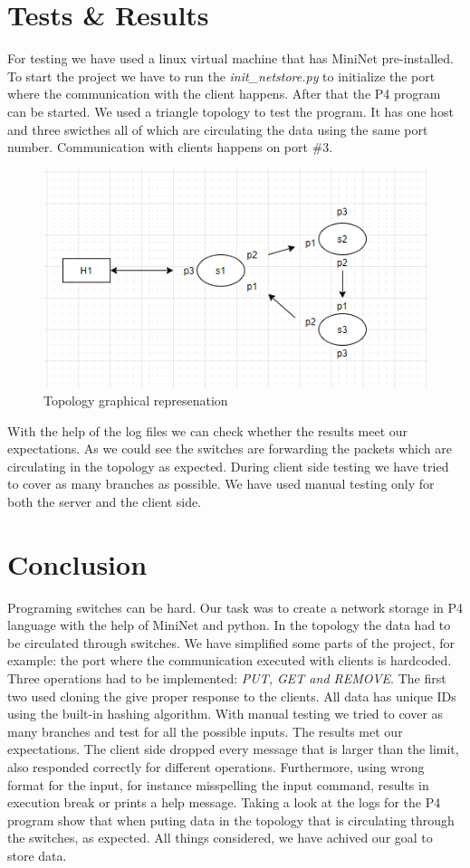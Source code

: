 \documentclass[sigconf,natbib=false]{acmart}
\begin{document}
\section{Tests \& Results}
For testing we have used a linux virtual machine that has MiniNet pre-installed. To start the project we have to run the \textit{init\_netstore.py} to initialize the port where the communication with the client happens. After that the P4 program can be started. We used a triangle topology to test the program. It has one host and three swicthes all of which are circulating the data using the same port number. Communication with clients happens on port \#3.
\begin{figure}[ht]
	\caption{Topology graphical represenation}
	\includegraphics[scale=0.7]{top.png}
	\centering
\end{figure}
With the help of the log files we can check whether the results meet our expectations. As we could see the switches are forwarding the packets which are circulating in the topology as expected. During client side testing we have tried to cover as many branches as possible. We have used manual testing only for both the server and the client side.
\section{Conclusion}
Programing switches can be hard. Our task was to create a network storage in P4 language with the help of MiniNet and python. In the topology the data had to be circulated through switches. We have simplified some parts of the project, for example: the port where the communication executed with clients is hardcoded. Three operations had to be implemented: \textit{PUT, GET and REMOVE}. The first two used cloning the give proper response to the clients. All data has unique IDs using the built-in hashing algorithm. With manual testing we tried to cover as many branches and test for all the possible inputs. The results met our expectations. The client side dropped every message that is larger than the limit, also responded correctly for different operations. Furthermore, using wrong format for the input, for instance misspelling the input command, results in execution break or prints a help message. Taking a look at the logs for the P4 program show that when puting data in the topology that is circulating through the switches, as expected. All things considered, we have achived our goal to store data.

\printbibliography
\end{document}
